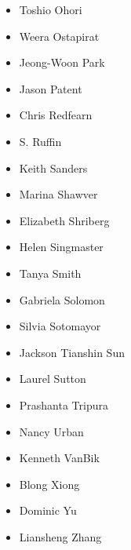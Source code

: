 \begin{itemize}
\item Toshio Ohori
\item Weera Ostapirat
\item Jeong-Woon Park
\item Jason Patent
\item Chris Redfearn
\item S. Ruffin
\item Keith Sanders
\item Marina Shawver
\item Elizabeth Shriberg
\item Helen Singmaster
\item Tanya Smith
\item Gabriela Solomon
\item Silvia Sotomayor
\item Jackson Tianshin Sun
\item Laurel Sutton
\item Prashanta Tripura
\item Nancy Urban
\item Kenneth VanBik
\item Blong Xiong
\item Dominic Yu
\item Liansheng Zhang
\end{itemize}